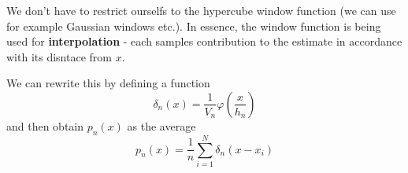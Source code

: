 \documentclass{scrartcl}
\begin{document}
\begin{appendices}
We don't have to restrict ourselfs to the hypercube window function (we can use for example Gaussian windows etc.). In essence, the window function is being used for \textbf{interpolation} - each samples contribution to the estimate in accordance with its disntace from \(x\).

We can rewrite this by defining a function 
\[\delta_n (x) = \frac{1}{V_n} \varphi (\frac{x}{h_n})\]
and then obtain \(p_n(x)\) as the average
\[p_n(x) = \frac{1}{n} \sum_{i=1}^N \delta_n(x-x_i)\]

\end{appendices}
\end{document}
